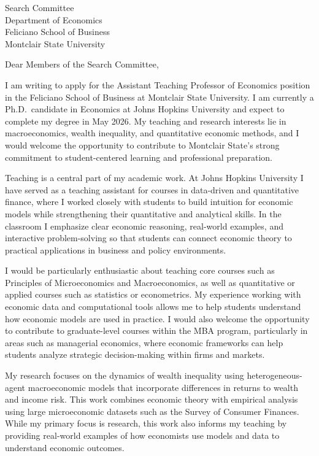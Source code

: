 \documentclass[11pt]{letter}
\begin{document}
\begin{letter}{Search Committee \\
Department of Economics \\
Feliciano School of Business \\
Montclair State University}

\opening{Dear Members of the Search Committee,}

I am writing to apply for the Assistant Teaching Professor of Economics position in the Feliciano School of Business at Montclair State University. I am currently a Ph.D.\ candidate in Economics at Johns Hopkins University and expect to complete my degree in May 2026. My teaching and research interests lie in macroeconomics, wealth inequality, and quantitative economic methods, and I would welcome the opportunity to contribute to Montclair State’s strong commitment to student-centered learning and professional preparation.

Teaching is a central part of my academic work. At Johns Hopkins University I have served as a teaching assistant for courses in data-driven and quantitative finance, where I worked closely with students to build intuition for economic models while strengthening their quantitative and analytical skills. In the classroom I emphasize clear economic reasoning, real-world examples, and interactive problem-solving so that students can connect economic theory to practical applications in business and policy environments.

I would be particularly enthusiastic about teaching core courses such as Principles of Microeconomics and Macroeconomics, as well as quantitative or applied courses such as statistics or econometrics. My experience working with economic data and computational tools allows me to help students understand how economic models are used in practice. I would also welcome the opportunity to contribute to graduate-level courses within the MBA program, particularly in areas such as managerial economics, where economic frameworks can help students analyze strategic decision-making within firms and markets.

My research focuses on the dynamics of wealth inequality using heterogeneous-agent macroeconomic models that incorporate differences in returns to wealth and income risk. This work combines economic theory with empirical analysis using large microeconomic datasets such as the Survey of Consumer Finances. While my primary focus is research, this work also informs my teaching by providing real-world examples of how economists use models and data to understand economic outcomes.


\end{letter}
\end{document}
